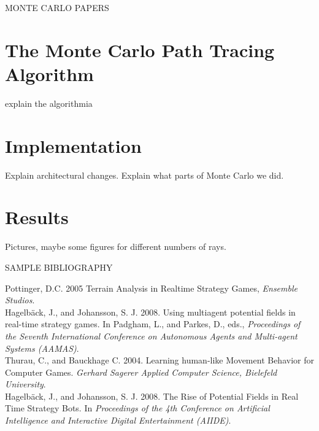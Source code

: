 \documentclass[journal]{IEEEtran}
\begin{document}
MONTE CARLO PAPERS

\section{The Monte Carlo Path Tracing Algorithm}
explain the algorithmia

\section{Implementation}
Explain architectural changes.
Explain what parts of Monte Carlo we did.

\section{Results}
Pictures, maybe some figures for different numbers of rays.




SAMPLE BIBLIOGRAPHY

\begin{thebibliography}{4}

Pottinger, D.C. 2005 Terrain Analysis in Realtime Strategy Games, \emph{Ensemble Studios}.
\\
Hagelb\"ack, J., and Johansson, S. J. 2008. Using multiagent
potential fields in real-time strategy games. In
Padgham, L., and Parkes, D., eds., \emph{Proceedings of the Seventh
International Conference on Autonomous Agents and
Multi-agent Systems (AAMAS)}.
\\
Thurau, C., and Bauckhage C. 2004. Learning human-like Movement Behavior for
Computer Games. \emph{Gerhard Sagerer Applied Computer Science,
Bielefeld University}.
\\
Hagelb\"ack, J., and Johansson, S. J. 2008. The Rise of Potential Fields in Real Time Strategy Bots. In \emph{ Proceedings of the 4th Conference on Artificial Intelligence and Interactive Digital Entertainment (AIIDE)}.
\end{thebibliography}

\end{document}
